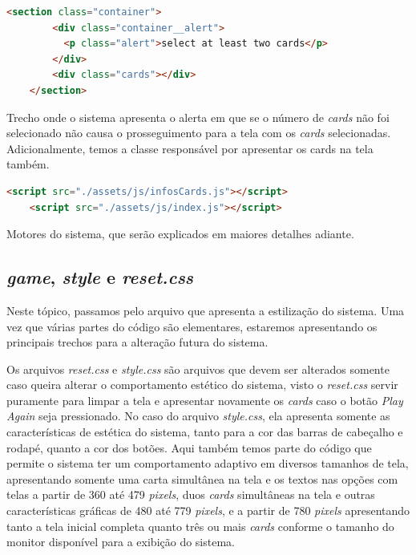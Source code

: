\begin{lstlisting}[language=html, caption=Alerta de seleção e área de criação dos \textit{cards}.]
    <section class="container">
        <div class="container__alert">
          <p class="alert">select at least two cards</p>
        </div>
        <div class="cards"></div>
    </section>
\end{lstlisting}
Trecho onde o sistema apresenta o alerta em que se o número de \textit{cards} não foi selecionado não causa o prosseguimento para a tela com os \textit{cards} selecionadas. Adicionalmente, temos a classe responsável por apresentar os cards na tela também.


\begin{lstlisting}[language=html, caption=Motores para o funcionamento do sistema.]
    <script src="./assets/js/infosCards.js"></script>
    <script src="./assets/js/index.js"></script>
\end{lstlisting}
Motores do sistema, que serão explicados em maiores detalhes adiante.

\subsection{\textit{game}, \textit{style} e \textit{reset.css}}
Neste tópico, passamos pelo arquivo que apresenta a estilização do sistema. Uma vez que várias partes do código são elementares, estaremos apresentando os principais trechos para a alteração futura do sistema. 

Os arquivos \textit{reset.css} e \textit{style.css} são arquivos que devem ser alterados somente caso queira alterar o comportamento estético do sistema, visto o \textit{reset.css} servir puramente para limpar a tela e apresentar novamente os \textit{cards} caso o botão \textit{Play Again} seja pressionado. No caso do arquivo \textit{style.css}, ela apresenta somente as características de estética do sistema, tanto para a cor das barras de cabeçalho e rodapé, quanto a cor dos botões. Aqui também temos parte do código que permite o sistema ter um comportamento adaptivo em diversos tamanhos de tela, apresentando somente uma carta simultânea na tela e os textos nas opções com telas a partir de 360 até 479 \textit{pixels}, duos \textit{cards} simultâneas na tela e outras características gráficas de 480 até 779 \textit{pixels}, e a partir de 780  \textit{pixels} apresentando tanto a tela inicial completa quanto três ou mais \textit{cards} conforme o tamanho do monitor disponível para a exibição do sistema.

